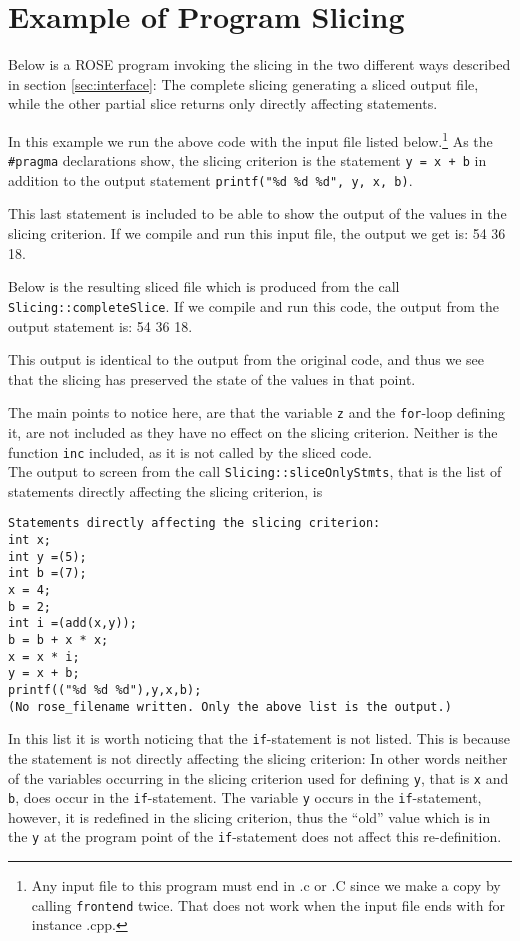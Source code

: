 \documentclass[11pt,a4paper,twoside]{article}
\begin{document}
\section{Example of Program Slicing}
Below is a ROSE program invoking the slicing in the two different ways described in section \ref{sec:interface}: The complete slicing generating a sliced output file, while the other partial slice returns only directly affecting statements. 
\scriptsize

\normalsize

In this example we run the above code with the input file listed below.\footnote{Any input file to this program must end in .c or .C since we make a copy by calling \texttt{frontend} twice. That does not work when the input file ends with for instance .cpp.} As the \texttt{\#pragma} declarations show, the slicing criterion is the statement \texttt{y = x + b} in addition to the output statement \texttt{printf("\%d \%d \%d", y, x, b)}.

This last statement is included to be able to show the output of the values in the slicing criterion. If we compile and run this input file, the output we get is: 54 36 18.
\scriptsize

\normalsize

Below is the resulting sliced file which is produced from the call \texttt{Slic\-ing::com\-plete\-Slice}. If we compile and run this code, the output from the output statement is: 54 36 18.

This output is identical to the output from the original code, and thus we see that the slicing has preserved the state of the values in that point.
\scriptsize

\normalsize
The main points to notice here, are that the variable \texttt{z} and the \texttt{for}-loop defining it, are not included as they have no effect on the slicing criterion. Neither is the function \texttt{inc} included, as it is not called by the sliced code.\\

\noindent
The output to screen from the call \texttt{Slicing::slice\-Only\-Stmts}, that is the list of statements directly affecting the slicing criterion, is 
\scriptsize
\begin{verbatim}
Statements directly affecting the slicing criterion:
int x;
int y =(5);
int b =(7);
x = 4;
b = 2;
int i =(add(x,y));
b = b + x * x;
x = x * i;
y = x + b;
printf(("%d %d %d"),y,x,b);
(No rose_filename written. Only the above list is the output.)
\end{verbatim}
\normalsize
In this list it is worth noticing that the \texttt{if}-statement is not listed. This is because the statement is not directly affecting the slicing criterion: In other words neither of the variables occurring in the slicing criterion used for defining \texttt{y}, that is \texttt{x} and \texttt{b}, does occur in the \texttt{if}-statement. The variable \texttt{y} occurs in the \texttt{if}-statement, however, it is redefined in the slicing criterion, thus the ``old'' value which  is in the \texttt{y} at the program point of the \texttt{if}-statement does not affect this re-definition.
\end{document}
